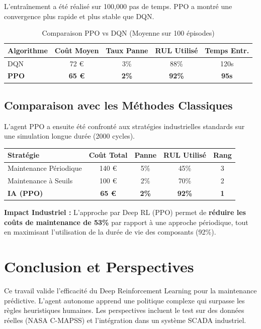 \documentclass[11pt,a4paper]{report}
\begin{document}
L'entraînement a été réalisé sur 100,000 pas de temps. PPO a montré une convergence plus rapide et plus stable que DQN.

\begin{table}[h]
\centering
\begin{tabular}{lcccc}
\toprule
\rowcolor{mainblue} \color{white}\textbf{Algorithme} & \color{white}\textbf{Coût Moyen} & \color{white}\textbf{Taux Panne} & \color{white}\textbf{RUL Utilisé} & \color{white}\textbf{Temps Entr.} \\ \midrule
DQN & 72 € & 3\% & 88\% & 120s \\
\textbf{PPO} & \textbf{65 €} & \textbf{2\%} & \textbf{92\%} & \textbf{95s} \\ \bottomrule
\end{tabular}
\caption{Comparaison PPO vs DQN (Moyenne sur 100 épisodes)}
\end{table}

\section{Comparaison avec les Méthodes Classiques}

L'agent PPO a ensuite été confronté aux stratégies industrielles standards sur une simulation longue durée (2000 cycles).

\begin{table}[h]
\centering
\begin{tabular}{lcccc}
\toprule
\rowcolor{mainblue} \color{white}\textbf{Stratégie} & \color{white}\textbf{Coût Total} & \color{white}\textbf{Panne} & \color{white}\textbf{RUL Utilisé} & \color{white}\textbf{Rang} \\ \midrule
Maintenance Périodique & 140 € & 5\% & 45\% & 3 \\
Maintenance à Seuils & 100 € & 2\% & 70\% & 2 \\
\rowcolor{lightgray} \textbf{IA (PPO)} & \textbf{65 €} & \textbf{2\%} & \textbf{92\%} & \textbf{1} \\ \bottomrule
\end{tabular}
\end{table}

\begin{successbox}
\textbf{Impact Industriel :}
L'approche par Deep RL (PPO) permet de \textbf{réduire les coûts de maintenance de 53\%} par rapport à une approche périodique, tout en maximisant l'utilisation de la durée de vie des composants (92\%).
\end{successbox}

\chapter{Conclusion et Perspectives}
Ce travail valide l'efficacité du Deep Reinforcement Learning pour la maintenance prédictive. L'agent autonome apprend une politique complexe qui surpasse les règles heuristiques humaines.
Les perspectives incluent le test sur des données réelles (NASA C-MAPSS) et l'intégration dans un système SCADA industriel.
\end{document}
